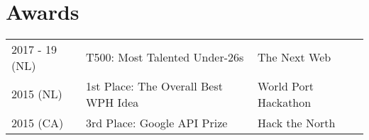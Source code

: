 \documentclass[]{deedy-resume-openfont}
\begin{document}
\begin{minipage}[t]{0.66\textwidth}
\vspace{0.3\topsep}
\href{https://leonoverweel.com/tags/model-convolutional-neural-network/}{} \textbullet \
\href{https://leonoverweel.com/tags/model-deep-q-network/}{} \textbullet \
\href{https://leonoverweel.com/tags/model-long-short-term-memory/}{}
\vspace{0.3\topsep}



\section{Awards} 
\hspace{-0.3cm}
\begin{tabular}{lll}
2017 - 19 (NL)   & T500: Most Talented Under-26s  & The Next Web\\
2015 (NL)   & 1st Place: The Overall Best WPH Idea      & World Port Hackathon\\
2015 (CA)   & 3rd Place: Google API Prize               & Hack the North\\
\end{tabular}
\vspace{0.1\topsep}

\end{minipage} 
\end{document}
